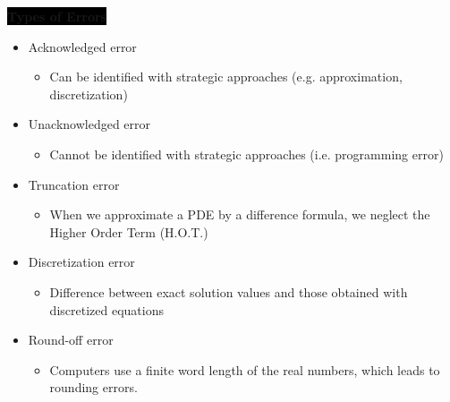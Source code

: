 \colorbox{black}{\textbf{\color{white}Types of Errors}}
\begin{itemize}
    \item Acknowledged error
    \begin{itemize}
        \item Can be identified with strategic approaches (e.g. approximation, discretization)
    \end{itemize}
    \item Unacknowledged error
    \begin{itemize}
        \item Cannot be identified with strategic approaches (i.e. programming error) 
    \end{itemize}
    \item Truncation error
    \begin{itemize}
        \item When we approximate a PDE by a difference formula, we neglect the Higher Order Term (H.O.T.)
    \end{itemize}
    \item Discretization error
    \begin{itemize}
        \item Difference between exact solution values and those obtained with discretized equations
    \end{itemize}
    \item Round-off error
    \begin{itemize}
        \item Computers use a finite word length of the real numbers, which leads to rounding errors.
    \end{itemize}
\end{itemize}

